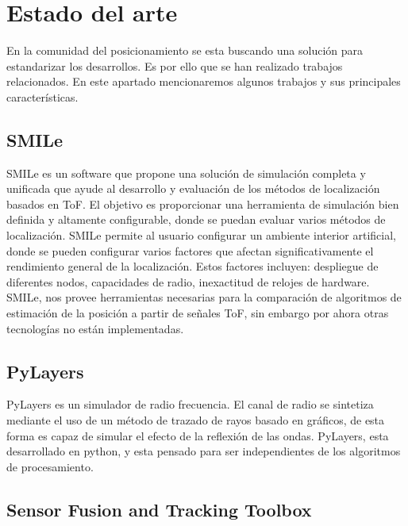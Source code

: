\section{Estado del arte}\label{S2}
En la comunidad del posicionamiento se esta buscando una solución para estandarizar los desarrollos. Es por ello que se han realizado trabajos relacionados. En este apartado mencionaremos algunos trabajos y sus principales características.




\subsection{SMILe}

SMILe \cite{Jankowski2018} es un software que propone una solución de simulación completa y unificada que ayude al desarrollo y evaluación de los métodos de localización basados en  ToF. El objetivo es proporcionar una herramienta de simulación bien definida y altamente configurable, donde se puedan evaluar varios métodos de localización. SMILe permite al usuario configurar un ambiente interior artificial, donde se pueden configurar varios factores que afectan significativamente el rendimiento general de la localización. Estos factores incluyen: despliegue de diferentes nodos, capacidades de radio, inexactitud de relojes de hardware.  SMILe, nos provee herramientas necesarias para la comparación de algoritmos de estimación de la posición a partir de señales ToF, sin embargo por ahora otras tecnologías no están implementadas.

\subsection{PyLayers}

PyLayers\cite{Amiot2013} es un simulador de radio frecuencia. El canal de radio se sintetiza mediante el uso de un método de trazado de rayos basado en gráficos, de esta forma es capaz de simular el efecto de la reflexión de las ondas.  PyLayers, esta desarrollado en python, y esta pensado para ser independientes de los algoritmos de procesamiento. 




\subsection{Sensor Fusion and Tracking Toolbox}

